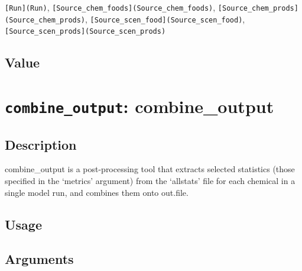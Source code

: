 \documentclass[
]{article}
\newenvironment{Shaded}{\begin{snugshade}}{\end{snugshade}}
\newcommand{\AttributeTok}[1]{\textcolor[rgb]{0.77,0.63,0.00}{#1}}
\newcommand{\FunctionTok}[1]{\textcolor[rgb]{0.00,0.00,0.00}{#1}}
\newcommand{\NormalTok}[1]{#1}
\newcommand{\SpecialCharTok}[1]{\textcolor[rgb]{0.00,0.00,0.00}{#1}}
\newcommand{\StringTok}[1]{\textcolor[rgb]{0.31,0.60,0.02}{#1}}
\begin{document}
\texttt{{[}Run{]}(Run)},
\texttt{{[}Source\_chem\_foods{]}(Source\_chem\_foods)},
\texttt{{[}Source\_chem\_prods{]}(Source\_chem\_prods)},
\texttt{{[}Source\_scen\_food{]}(Source\_scen\_food)},
\texttt{{[}Source\_scen\_prods{]}(Source\_scen\_prods)}

\hypertarget{value-5}{%
\subsection{Value}\label{value-5}}

\hypertarget{combine_output-combine_output}{%
\section{\texorpdfstring{\texttt{combine\_output}:
combine\_output}{combine\_output: combine\_output}}\label{combine_output-combine_output}}

\hypertarget{description-10}{%
\subsection{Description}\label{description-10}}

combine\_output is a post-processing tool that extracts selected
statistics (those specified in the `metrics' argument) from the
`allstats' file for each chemical in a single model run, and combines
them onto out.file.

\hypertarget{usage-10}{%
\subsection{Usage}\label{usage-10}}

\begin{Shaded}
\end{Shaded}

\hypertarget{arguments-7}{%
\subsection{Arguments}\label{arguments-7}}
\end{document}
